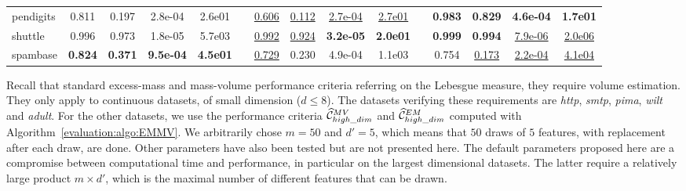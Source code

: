 \begin{table}[!ht]
{\begin{tabular}{l cccc c cccc c cccc}
pendigits    &0.811 &0.197 &2.8e-04&2.6e01 & &\underline{0.606} &\underline{0.112} &\underline{2.7e-04}&\underline{2.7e01}   & &\bf 0.983 &\bf 0.829 &\bf 4.6e-04&\bf 1.7e01 \\
shuttle      &0.996 &0.973 &1.8e-05&5.7e03 & &\underline{0.992} &\underline{0.924} &\bf 3.2e-05&\bf 2.0e01   & &\bf 0.999 &\bf 0.994 &\underline{7.9e-06}&\underline{2.0e06} \\
spambase     &\bf 0.824 &\bf 0.371 &\bf 9.5e-04&\bf 4.5e01&  &\underline{0.729} &0.230 &4.9e-04&1.1e03  &  &0.754 &\underline{0.173} &\underline{2.2e-04}&\underline{4.1e04} \\
\bottomrule
\end{tabular}
}
\end{table}

Recall that standard excess-mass and mass-volume performance criteria referring on the Lebesgue measure, they require volume estimation. They only apply to continuous datasets, of small dimension ($d \le 8$). The datasets verifying these requirements are \emph{http}, \emph{smtp}, %
\emph{pima}, \emph{wilt} and \emph{adult}.
For the other datasets, we use the performance criteria $\widehat{\mathcal{C}}^{MV}_{high\_dim}$ and $\widehat{\mathcal{C}}^{EM}_{high\_dim}$ computed with Algorithm~\ref{evaluation:algo:EMMV}. We arbitrarily chose $m = 50$ and $d'=5$, which means that $50$ draws of $5$ features, with replacement after each draw, are done.
Other parameters have also been tested but are not presented here. The default parameters proposed here are a compromise between computational time and performance, in particular on the largest dimensional datasets. The latter require a relatively large product $m \times d'$, which is the maximal number of different features that can be drawn.


